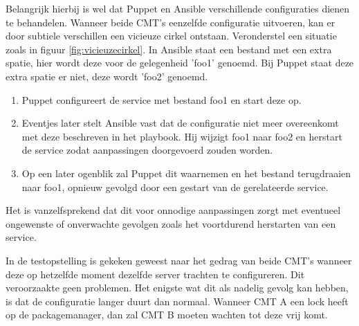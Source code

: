  Belangrijk hierbij is wel dat Puppet en Ansible verschillende configuraties dienen te behandelen. Wanneer beide \gls{CMT}'s eenzelfde configuratie uitvoeren, kan er door subtiele verschillen een vicieuze cirkel ontstaan.
Veronderstel een situatie zoals in figuur \ref{fig:vicieuzecirkel}. In Ansible staat een bestand met een extra spatie, hier wordt deze voor de gelegenheid 'foo1' genoemd. Bij Puppet staat deze extra spatie er niet, deze wordt 'foo2' genoemd. 
\begin{enumerate}
\item Puppet configureert de service met bestand foo1 en start deze op.
\item  Eventjes later stelt Ansible vast dat de configuratie niet meer overeenkomt met deze beschreven in het playbook. Hij wijzigt foo1 naar foo2 en herstart de service zodat aanpassingen doorgevoerd zouden worden.
\item  Op een later ogenblik zal Puppet dit waarnemen en het bestand terugdraaien naar foo1, opnieuw gevolgd door een gestart van de gerelateerde service.
\end{enumerate}
Het is vanzelfsprekend dat dit voor onnodige aanpassingen zorgt met eventueel ongewenste of onverwachte gevolgen zoals het voortdurend herstarten van een service.

In de testopstelling is gekeken geweest naar het gedrag van beide \gls{CMT}'s wanneer deze op hetzelfde moment dezelfde server trachten te configureren. Dit veroorzaakte geen problemen.
Het enigste wat dit als nadelig gevolg kan hebben, is dat de configuratie langer duurt dan normaal. Wanneer \gls{CMT} A een lock heeft op de \gls{packagemanager}, dan zal \gls{CMT} B moeten wachten tot deze vrij komt. 



